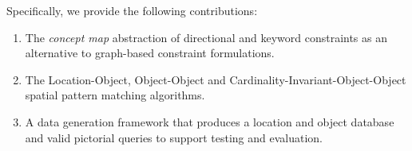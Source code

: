     
\par{
    Specifically, we provide the following contributions:
    \begin{enumerate}
        \item The \textit{concept map} abstraction of directional and keyword constraints as an alternative to graph-based constraint formulations.
        \item The Location-Object, Object-Object and Cardinality-Invariant-Object-Object spatial pattern matching algorithms. 
        \item A data generation framework that produces a location and object database and valid pictorial queries to support testing and evaluation.
        
    \end{enumerate}

}
